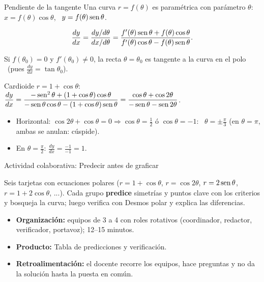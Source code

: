 \documentclass[10pt,aspectratio=169]{beamer}
\begin{document}
\begin{frame}{Pendiente de la tangente}
  Una curva $r=f(\theta)$ es paramétrica con parámetro $\theta$: \ $x=f(\theta)\cos\theta$, \ $y=f(\theta)\operatorname{sen}\theta$.
  \begin{teorema}
    \[ \frac{dy}{dx}=\frac{dy/d\theta}{dx/d\theta}=\frac{f'(\theta)\operatorname{sen}\theta+f(\theta)\cos\theta}{f'(\theta)\cos\theta-f(\theta)\operatorname{sen}\theta}. \]
  \end{teorema}
  \begin{proposicion}
    Si $f(\theta_0)=0$ y $f'(\theta_0)\neq0$, la recta $\theta=\theta_0$ es tangente a la curva en el polo \ (pues $\frac{dy}{dx}=\tan\theta_0$).
  \end{proposicion}
  \begin{ejemplo}[4]
    Cardioide $r=1+\cos\theta$: \ $\dfrac{dy}{dx}=\dfrac{-\operatorname{sen}^2\theta+(1+\cos\theta)\cos\theta}{-\operatorname{sen}\theta\cos\theta-(1+\cos\theta)\operatorname{sen}\theta}=\dfrac{\cos\theta+\cos2\theta}{-\operatorname{sen}\theta-\operatorname{sen}2\theta}$.
    \begin{itemize}
      \item Horizontal: $\cos2\theta+\cos\theta=0\Rightarrow\cos\theta=\frac12$ ó $\cos\theta=-1$: \ $\theta=\pm\frac\pi3$ (en $\theta=\pi$, ambas se anulan: cúspide).
      \item En $\theta=\frac\pi2$: $\frac{dy}{dx}=\frac{-1}{-1}=1$.
    \end{itemize}
  \end{ejemplo}
\end{frame}

\begin{frame}{Actividad colaborativa: Predecir antes de graficar}
  \small
  \begin{activa}
    Seis tarjetas con ecuaciones polares ($r=1+\cos\theta$, $r=\cos2\theta$, $r=2\operatorname{sen}\theta$, $r=1+2\cos\theta$, ...). Cada grupo \textbf{predice} simetrías y puntos clave con los criterios y bosqueja la curva; luego verifica con Desmos polar y explica las diferencias.
  \end{activa}
  \begin{itemize}
    \item \textbf{Organización:} equipos de 3 a 4 con roles rotativos (coordinador, redactor, verificador, portavoz); 12--15 minutos.
    \item \textbf{Producto:} Tabla de predicciones y verificación.
    \item \textbf{Retroalimentación:} el docente recorre los equipos, hace preguntas y no da la solución hasta la puesta en común.
  \end{itemize}
\end{frame}
\end{document}
